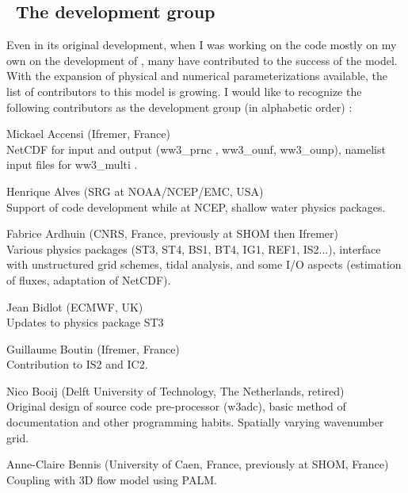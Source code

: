 \vssub
\subsection{~The development group}
\vssub

Even in its original development, when I was working on the code mostly on my
own on the development of \ws, many have contributed to the success of the
model. With the expansion of physical and numerical parameterizations
available, the list of contributors to this model is growing. I would like to
recognize the following contributors as the development group (in alphabetic
order) :

\begin{list}{\ldots}{ }

\item [Mickael Accensi] (Ifremer, France) \\
  NetCDF for input and output (ww3\_prnc , ww3\_ounf, ww3\_ounp), namelist input files for ww3\_multi .

\item [Henrique Alves] (SRG at NOAA/NCEP/EMC, USA) \\
  Support of code development while at NCEP, shallow water physics packages.

\item [Fabrice Ardhuin] (CNRS, France, previously at SHOM then Ifremer) \\
  Various physics packages (ST3, ST4, BS1, BT4, IG1, REF1, IS2...), interface with unstructured grid schemes, tidal analysis, and some I/O aspects (estimation of fluxes, adaptation of NetCDF). 

\item [Jean Bidlot] (ECMWF, UK) \\
  Updates to physics package ST3

\item [Guillaume Boutin] (Ifremer, France) \\
  Contribution to IS2 and IC2. 

  \item [Nico Booij] (Delft University of Technology, The Netherlands, retired) \\
  Original design of source code pre-processor ({\code w3adc}), basic method
  of documentation and other programming habits. Spatially varying wavenumber
  grid.

\item [Anne-Claire Bennis] (University of Caen, France, previously at SHOM, France) \\
  Coupling with 3D flow model using PALM.


\end{list}
